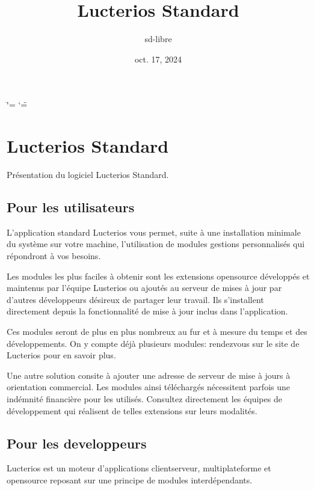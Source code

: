 \documentclass[letterpaper,10pt,french]{sphinxmanual}
\title{Lucterios Standard}
\date{oct. 17, 2024}
\author{sd-libre}
\begin{document}
\ifdefined\shorthandoff
  \ifnum\catcode`\=\string=\active\shorthandoff{=}\fi
  \ifnum\catcode`\"=\active{}\fi
\fi

\pagestyle{empty}
\sphinxmaketitle
\pagestyle{plain}
\sphinxtableofcontents
\pagestyle{normal}
\label{\detokenize{index::doc}}


\sphinxstepscope


\chapter{Lucterios Standard}
\label{\detokenize{standard/index:lucterios-standard}}\label{\detokenize{standard/index::doc}}
\sphinxAtStartPar
Présentation du logiciel Lucterios Standard.


\section{Pour les utilisateurs}
\label{\detokenize{standard/index:pour-les-utilisateurs}}
\sphinxAtStartPar
L’application standard Lucterios vous permet, suite à une installation minimale du système sur votre machine, l’utilisation de modules gestions personnalisés qui répondront à vos besoins.

\sphinxAtStartPar
Les modules les plus faciles à obtenir sont les extensions open\sphinxhyphen{}source développés et maintenus par l’équipe Lusterios ou ajoutés au serveur de mises à jour par d’autres développeurs désireux de partager leur travail. Ils s’installent directement depuis la fonctionnalité de mise à jour inclus dans l’application.

\sphinxAtStartPar
Ces modules seront de plus en plus nombreux au fur et à mesure du temps et des développements. On y compte déjà plusieurs modules: rendez\sphinxhyphen{}vous sur le site de Lucterios pour en savoir plus.

\sphinxAtStartPar
Une autre solution consite à ajouter une adresse de serveur de mise à jours à orientation commercial. Les modules ainsi téléchargés nécessitent parfois une indémnité financière pour les utilisés. Consultez directement les équipes de développement qui réalisent de telles extensions sur leurs modalités.


\section{Pour les developpeurs}
\label{\detokenize{standard/index:pour-les-developpeurs}}
\sphinxAtStartPar
Lucterios est un moteur d’applications client\sphinxhyphen{}serveur, multi\sphinxhyphen{}plateforme et open\sphinxhyphen{}source reposant sur une principe de modules interdépendants.
\end{document}

